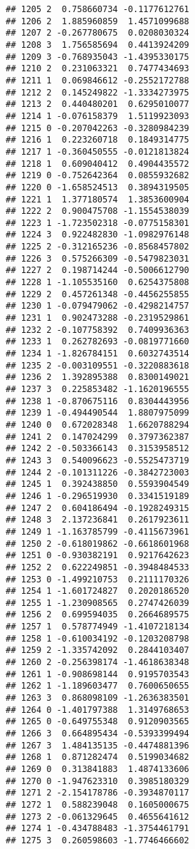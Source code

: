 \documentclass[
]{article}
\begin{document}
\begin{verbatim}
## 1205 2  0.758660734 -0.1177612761
## 1206 2  1.885960859  1.4571099688
## 1207 2 -0.267780675  0.0208030324
## 1208 3  1.756585694  0.4413924209
## 1209 3 -0.768935043 -1.4395330175
## 1210 2  0.231063321  0.7477434693
## 1211 1  0.069846612 -0.2552172788
## 1212 2  0.145249822 -1.3334273975
## 1213 2  0.440480201  0.6295010077
## 1214 1 -0.076158379  1.5119923093
## 1215 0 -0.207042263 -0.3280984239
## 1216 1  0.223260718  0.1849314775
## 1217 1 -0.360450555 -0.0121813824
## 1218 1  0.609040412  0.4904435572
## 1219 0 -0.752642364  0.0855932682
## 1220 0 -1.658524513  0.3894319505
## 1221 1  1.377180574  1.3853600904
## 1222 2  0.900475708 -1.1554538039
## 1223 1 -1.723502318 -0.0775158301
## 1224 3  0.922482830 -1.0982976148
## 1225 2 -0.312165236 -0.8568457802
## 1226 3  0.575266309 -0.5479823031
## 1227 2  0.198714244 -0.5006612790
## 1228 1 -1.105535160  0.6254375808
## 1229 2  0.457261348 -0.4456255855
## 1230 1 -0.079479062 -0.4298214757
## 1231 1  0.902473288 -0.2319529861
## 1232 2 -0.107758392  0.7409936363
## 1233 1  0.262782693 -0.0819771660
## 1234 1 -1.826784151  0.6032743514
## 1235 2 -0.003109551 -0.3220883618
## 1236 2  1.392895388  0.8300149021
## 1237 3  0.225853482 -1.1620196555
## 1238 1 -0.870675116  0.8304443956
## 1239 1 -0.494490544  1.8807975099
## 1240 0  0.672028348  1.6620788294
## 1241 2  0.147024299  0.3797362387
## 1242 2 -0.503366143  0.3153958512
## 1243 3  0.540096623 -0.5525473719
## 1244 2 -0.101311226 -0.3842723003
## 1245 1  0.392438850  0.5593904549
## 1246 1 -0.296519930  0.3341519189
## 1247 2  0.604186494 -0.1928249315
## 1248 3  2.137236841  0.2617923611
## 1249 1 -1.163785799 -0.4115673961
## 1250 2 -0.618019862 -0.6618601968
## 1251 0 -0.930382191  0.9217642623
## 1252 2  0.622249851 -0.3948484533
## 1253 0 -1.499210753  0.2111170326
## 1254 1 -1.601724827  0.2020186520
## 1255 1 -1.230908565  0.2747426039
## 1256 2  0.699594035  0.2664689575
## 1257 1  0.578774949 -1.4107218134
## 1258 1 -0.610034192 -0.1203208798
## 1259 2 -1.335742092  0.2844103407
## 1260 2 -0.256398174 -1.4618638348
## 1261 1 -0.908698144  0.9195703543
## 1262 1 -1.189603477  0.7600650655
## 1263 3  0.868098109 -1.2636383501
## 1264 0 -1.401797388  1.3149768653
## 1265 0 -0.649755348  0.9120903565
## 1266 3  0.664895434 -0.5393399494
## 1267 3  1.484135135 -0.4474881396
## 1268 1  0.871282474  0.5199034682
## 1269 0  0.313841883  1.4874133606
## 1270 0 -1.947623310  0.3985180329
## 1271 2 -2.154178786 -0.3934870117
## 1272 1  0.588239048  0.1605000675
## 1273 2 -0.061329645  0.4655641612
## 1274 1 -0.434788483 -1.3754461791
## 1275 3  0.260598603 -1.7746466602

\end{verbatim}
\end{document}
